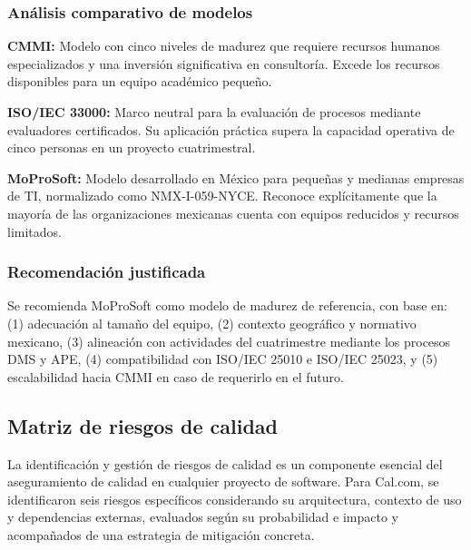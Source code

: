 \documentclass{article}
\begin{document}
\subsubsection{Análisis comparativo de modelos}
\textbf{CMMI:} Modelo con cinco niveles de madurez que requiere recursos humanos especializados y una inversión significativa en consultoría. Excede los recursos disponibles para un equipo académico pequeño.

\textbf{ISO/IEC 33000:} Marco neutral para la evaluación de procesos mediante evaluadores certificados. Su aplicación práctica supera la capacidad operativa de cinco personas en un proyecto cuatrimestral.

\textbf{MoProSoft:} Modelo desarrollado en México para pequeñas y medianas empresas de TI, normalizado como NMX-I-059-NYCE. Reconoce explícitamente que la mayoría de las organizaciones mexicanas cuenta con equipos reducidos y recursos limitados.

\subsubsection{Recomendación justificada}
Se recomienda MoProSoft como modelo de madurez de referencia, con base en: (1) adecuación al tamaño del equipo, (2) contexto geográfico y normativo mexicano, (3) alineación con actividades del cuatrimestre mediante los procesos DMS y APE, (4) compatibilidad con ISO/IEC 25010 e ISO/IEC 25023, y (5) escalabilidad hacia CMMI en caso de requerirlo en el futuro.

\subsection{Matriz de riesgos de calidad}

La identificación y gestión de riesgos de calidad es un componente esencial del aseguramiento de calidad en cualquier proyecto de software. Para Cal.com, se identificaron seis riesgos específicos considerando su arquitectura, contexto de uso y dependencias externas, evaluados según su probabilidad e impacto y acompañados de una estrategia de mitigación concreta.
\end{document}
